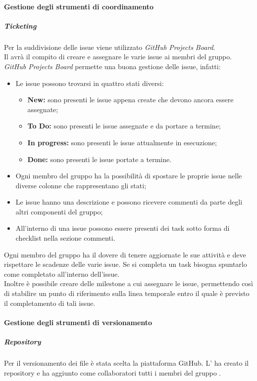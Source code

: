 \paragraph{Gestione degli strumenti di coordinamento}
\subparagraph{Ticketing}
Per la suddivisione delle issue\glo{} viene utilizzato \textit{GitHub Projects Board}\glo{}.\\
Il \roleProjectManagerLow{} avrà il compito di creare e assegnare le varie issue\glo{} ai membri del gruppo.\\
\textit{GitHub Projects Board}\glo{} permette una buona gestione delle issue\glo{}, infatti:
\begin{itemize}
  \item Le issue\glo{} possono trovarsi in quattro stati diversi:
        \begin{itemize}
          \item \textbf{New:} sono presenti le issue\glo{} appena create che devono ancora essere assegnate;
          \item \textbf{To Do:} sono presenti le issue\glo{} assegnate e da portare a termine;
          \item \textbf{In progress:} sono presenti le issue\glo{} attualmente in esecuzione;
          \item \textbf{Done:} sono presenti le issue\glo{} portate a termine.
        \end{itemize}
  \item Ogni membro del gruppo ha la possibilità di spostare le proprie issue\glo{} nelle diverse colonne che rappresentano gli stati;
  \item Le issue\glo{} hanno una descrizione e possono ricevere commenti da parte degli altri componenti del gruppo;
  \item All'interno di una issue\glo{} possono essere presenti dei task sotto forma di checklist nella sezione commenti.
\end{itemize}
Ogni membro del gruppo ha il dovere di tenere aggiornate le sue attività e deve rispettare le scadenze delle varie issue\glo{}.
Se si completa un task bisogna spuntarlo come completato all'interno dell'issue\glo{}.\\
Inoltre è possibile creare delle milestone\glo{} a cui assegnare le issue\glo{}, permettendo così di stabilire un punto di
riferimento sulla linea temporale entro il quale è previsto il completamento di tali issue\glo{}.

\paragraph{Gestione degli strumenti di versionamento}
\subparagraph{Repository}
Per il versionamento dei file è stata scelta la piattaforma GitHub\glo{}. L'\roleAdministratorLow{} ha creato il repository\glo{} e ha aggiunto
come collaboratori tutti i membri del gruppo \groupName{}.

